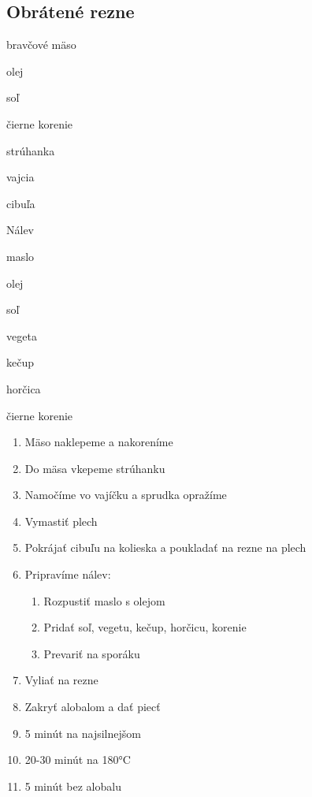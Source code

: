 \setcounter{step}{0}
\subsection{Obrátené rezne}

\begin{ingredient}
\def\portions{4}%

\begin{main}
	\item bravčové mäso
	\item olej
	\item soľ
	\item čierne korenie
	\item strúhanka
	\item vajcia
	\item cibuľa
\end{main}
\begin{subingredient}{Nálev}
	\item maslo
	\item olej
	\item soľ
	\item vegeta
	\item kečup
	\item horčica
	\item čierne korenie
\end{subingredient}
\end{ingredient}
\begin{recipe}

\begin{enumerate}

\item{Mäso naklepeme a nakoreníme}
\item{Do mäsa vkepeme strúhanku}
\item{Namočíme vo vajíčku a sprudka opražíme}	
\item{Vymastiť plech}
\item{Pokrájať cibuľu na kolieska a poukladať na rezne na plech}
\item{Pripravíme nálev:}
\begin{enumerate}
\item{Rozpustiť maslo s olejom}
\item{Pridať soľ, vegetu, kečup, horčicu, korenie}
\item{Prevariť na sporáku}
\end{enumerate}
\item{Vyliať na rezne}
\item{Zakryť alobalom a dať piecť}
\item{5 minút na najsilnejšom}
\item{20-30 minút na 180°C}
\item{5 minút bez alobalu}

\end{enumerate}
\end{recipe}

\begin{notes}

\end{notes}
\clearpage	